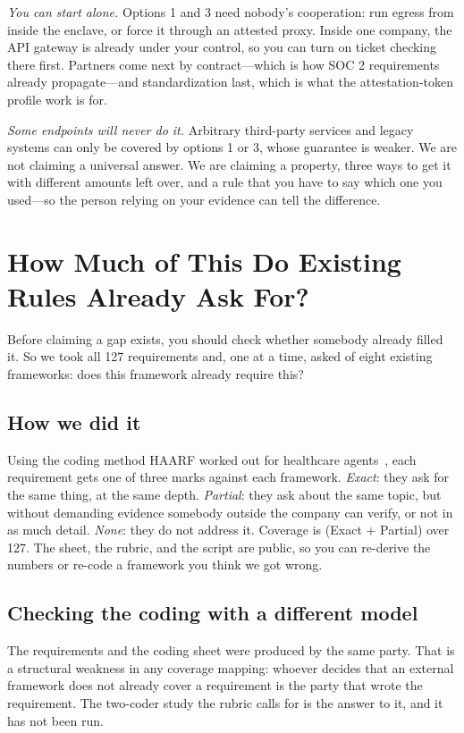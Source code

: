 \documentclass[11pt]{article}
\begin{document}
\emph{You can start alone.} Options 1 and 3 need nobody's cooperation: run
egress from inside the enclave, or force it through an attested proxy. Inside
one company, the API gateway is already under your control, so you can turn on
ticket checking there first. Partners come next by contract---which is how SOC
2 requirements already propagate---and standardization last, which is what the
attestation-token profile work is for.

\emph{Some endpoints will never do it.} Arbitrary third-party services and
legacy systems can only be covered by options 1 or 3, whose guarantee is
weaker. We are not claiming a universal answer. We are claiming a property,
three ways to get it with different amounts left over, and a rule that you
have to say which one you used---so the person relying on your evidence can
tell the difference.

\section{How Much of This Do Existing Rules Already Ask For?}
\label{sec:gap}

Before claiming a gap exists, you should check whether somebody already filled
it. So we took all 127 requirements and, one at a time, asked of eight
existing frameworks: does this framework already require this?

\subsection{How we did it}
Using the coding method HAARF worked out for healthcare
agents~\cite{haarf2026}, each requirement gets one of three marks against each
framework. \emph{Exact}: they ask for the same thing, at the same depth.
\emph{Partial}: they ask about the same topic, but without demanding evidence
somebody outside the company can verify, or not in as much detail.
\emph{None}: they do not address it. Coverage is (Exact + Partial) over 127.
The sheet, the rubric, and the script are public, so you can re-derive the
numbers or re-code a framework you think we got wrong.

\subsection{Checking the coding with a different model}
\label{sec:crossmodel}

The requirements and the coding sheet were produced by the same party. That is
a structural weakness in any coverage mapping: whoever decides that an external
framework does not already cover a requirement is the party that wrote the
requirement. The two-coder study the rubric calls for is the answer to it, and
it has not been run.
\end{document}
